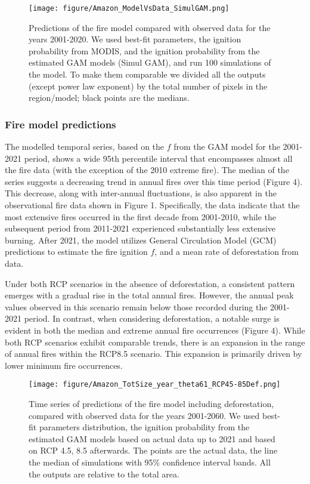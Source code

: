 \documentclass[
]{article}
\begin{document}
\begin{figure}
\centering
\texttt{[image: figure/Amazon\_ModelVsData\_SimulGAM.png]}
\caption{Predictions of the fire model compared with observed data for
the years 2001-2020. We used best-fit parameters, the ignition
probability from MODIS, and the ignition probability from the estimated
GAM models (Simul GAM), and run 100 simulations of the model. To make
them comparable we divided all the outputs (except power law exponent)
by the total number of pixels in the region/model; black points are the
medians.}
\end{figure}

\subsubsection{Fire model predictions}\label{fire-model-predictions}

The modelled temporal series, based on the \(f\) from the GAM model for
the 2001-2021 period, shows a wide 95th percentile interval that
encompasses almost all the fire data (with the exception of the 2010
extreme fire). The median of the series suggests a decreasing trend in
annual fires over this time period (Figure 4). This decrease, along with
inter-annual fluctuations, is also apparent in the observational fire
data shown in Figure 1. Specifically, the data indicate that the most
extensive fires occurred in the first decade from 2001-2010, while the
subsequent period from 2011-2021 experienced substantially less
extensive burning. After 2021, the model utilizes General Circulation
Model (GCM) predictions to estimate the fire ignition \(f\), and a mean
rate of deforestation from data.

Under both RCP scenarios in the absence of deforestation, a consistent
pattern emerges with a gradual rise in the total annual fires. However,
the annual peak values observed in this scenario remain below those
recorded during the 2001-2021 period. In contrast, when considering
deforestation, a notable surge is evident in both the median and extreme
annual fire occurrences (Figure 4). While both RCP scenarios exhibit
comparable trends, there is an expansion in the range of annual fires
within the RCP8.5 scenario. This expansion is primarily driven by lower
minimum fire occurrences.

\begin{figure}
\centering
\texttt{[image: figure/Amazon\_TotSize\_year\_theta61\_RCP45-85Def.png]}
\caption{Time series of predictions of the fire model including
deforestation, compared with observed data for the years 2001-2060. We
used best-fit parameters distribution, the ignition probability from the
estimated GAM models based on actual data up to 2021 and based on RCP
4.5, 8.5 afterwards. The points are the actual data, the line the median
of simulations with 95\% confidence interval bands. All the outputs are
relative to the total area.}
\end{figure}
\end{document}
